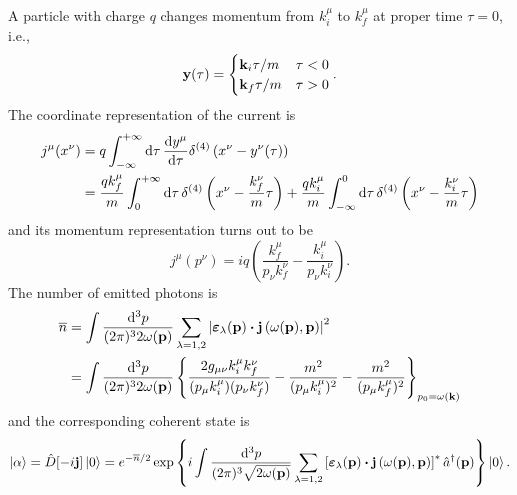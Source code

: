 \begin{example}[Bremsstrahlung]
	A particle with charge $q$ changes momentum from $k_i^\mu$ to $k_f^\mu$ at proper time $\tau=0$, i.e.,
	\begin{equation}
		\vb{y}(\tau)
		=
		\begin{cases}
			\vb{k}_i\tau/m
			&
			\tau<0
			\\
			\vb{k}_f\tau/m
			&
			\tau>0
		\end{cases}
		.
	\end{equation}
	The coordinate representation of the current is~\cite[p.~178]{Peskin1995}
	\begin{equation}
		\begin{split}
			j^\mu(x^\nu)
			&=
			q\int_{-\infty}^{+\infty}\dd{\tau}
			\dv{y^\mu}{\tau}
			\delta^{(4)}\left(
				x^\nu
				-
				y^\nu(\tau)
			\right)
			\\
			&=
			\frac{qk_f^\mu}{m}
			\int_0^{+\infty}\dd{\tau}
			\delta^{(4)}\left(x^\nu-\frac{k_f^\nu}{m}\tau\right)
			+
			\frac{qk_i^\mu}{m}
			\int_{-\infty}^0\dd{\tau}
			\delta^{(4)}\left(x^\nu-\frac{k_i^\nu}{m}\tau\right)
		\end{split}
	\end{equation}
	and its momentum representation turns out to be~\cite[p.~39]{Itzykson2012}
	\begin{equation*}
		j^\mu(p^\nu)
		=
		iq\left(
			\frac{k_f^\mu}{p_\nu k_f^\nu}
			-
			\frac{k_i^\mu}{p_\nu k_i^\nu}
		\right)
		.
	\end{equation*}
	The number of emitted photons is~\cite[p.~41]{Itzykson2012}
	\begin{equation*}
		\begin{split}
			\overline{n}
			&=
			\int\frac{\dd[3]{p}}{(2\pi)^32\omega(\vb{p})}
			\sum_{\lambda=1,2}
			\abs{
				\boldsymbol{\varepsilon}_\lambda(\vb{p})
				\vdot
				\vb{j}\left(\omega(\vb{p}),\vb{p}\right)
			}^2
			\\
			&=
			\int\frac{\dd[3]{p}}{(2\pi)^32\omega(\vb{p})}
			\left\{
				\frac{2g_{\mu\nu}k_i^\mu k_f^\nu}{(p_\mu k_i^\mu)(p_\nu k_f^\nu)}
				-
				\frac{m^2}{(p_\mu k_i^\mu)^2}
				-
				\frac{m^2}{(p_\mu k_f^\mu)^2}
			\right\}_{p_0=\omega(\vb{k})}
		\end{split}
	\end{equation*}
	and the corresponding coherent state is
	\begin{equation*}
		\ket{\alpha}
		=
		\hat{D}[-i\vb{j}]
		\ket{0}
		=
		e^{-\overline{n}/2}
		\exp\left\{
			i
			\int\frac{\dd[3]{p}}{(2\pi)^3\sqrt{2\omega(\vb{p})}}
			\sum_{\lambda=1,2}
			\left[
				\boldsymbol{\varepsilon}_\lambda(\vb{p})
				\vdot
				\vb{j}\left(\omega(\vb{p}),\vb{p}\right)
			\right]^*
			\hat{a}^\dagger(\vb{p})
		\right\}
		\ket{0}
		.
	\end{equation*}
\end{example}
\begin{example}
	
\end{example}